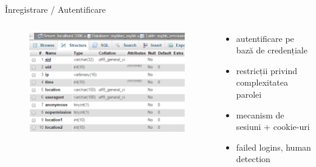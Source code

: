\documentclass[9pt]{beamer}
\begin{document}
\begin{frame}{Înregistrare / Autentificare}
  \begin{columns}
    \begin{column}[c]{0.50\textwidth}
      \begin{figure}
        \includegraphics[scale=0.4]{figures/screen3}
      \end{figure}
    \end{column}
    \begin{column}[c]{0.50\textwidth}
        \begin{itemize}
		\vskip10pt
		\item autentificare pe bază de credențiale
		\vskip10pt
		\item restricții privind complexitatea parolei
		\vskip10pt
		\item mecanism de sesiuni + cookie-uri
		\vskip10pt
		\item failed logins, human detection
	    \end{itemize}
    \end{column}
  \end{columns}
\end{frame}
\end{document}
